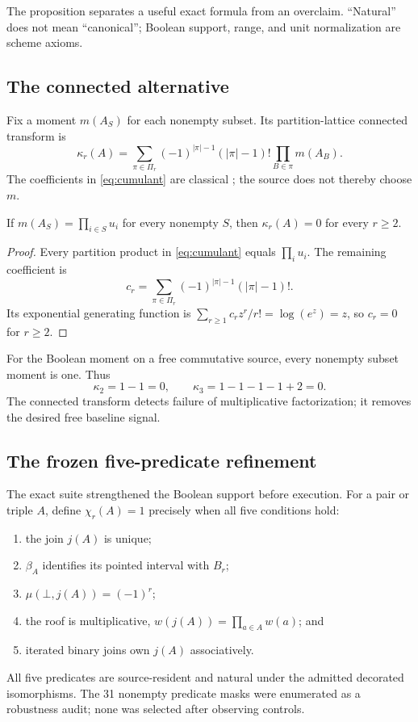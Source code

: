 The proposition separates a useful exact formula from an overclaim.
“Natural” does not mean “canonical”; Boolean support, range, and unit
normalization are scheme axioms.

\subsection{The connected alternative}

Fix a moment \(m(A_S)\) for each nonempty subset.  Its partition-lattice
connected transform is
\begin{equation}
 \kappa_r(A)=
 \sum_{\pi\in\Pi_r}(-1)^{|\pi|-1}(|\pi|-1)!
 \prod_{B\in\pi}m(A_B).
 \label{eq:cumulant}
\end{equation}
The coefficients in \eqref{eq:cumulant} are classical
\citep{Speed1983}; the source does not thereby choose \(m\).

\begin{lemma}
\label{lem:factorization-cancellation}
If
\(
 m(A_S)=\prod_{i\in S}u_i
\)
for every nonempty \(S\), then \(\kappa_r(A)=0\) for every \(r\ge2\).
\end{lemma}
\begin{proof}
Every partition product in \eqref{eq:cumulant} equals
\(\prod_i u_i\).  The remaining coefficient is
\[
 c_r=\sum_{\pi\in\Pi_r}(-1)^{|\pi|-1}(|\pi|-1)!.
\]
Its exponential generating function is
\(
 \sum_{r\ge1}c_r z^r/r!=\log(e^z)=z
\), so \(c_r=0\) for \(r\ge2\).
\end{proof}

For the Boolean moment on a free commutative source, every nonempty subset
moment is one.  Thus
\begin{equation}
 \kappa_2=1-1=0,
 \qquad
 \kappa_3=1-1-1-1+2=0.
 \label{eq:low-cumulants}
\end{equation}
The connected transform detects failure of multiplicative factorization;
it removes the desired free baseline signal.

\subsection{The frozen five-predicate refinement}

The exact suite strengthened the Boolean support before execution.  For a
pair or triple \(A\), define \(\chi_r(A)=1\) precisely when all five
conditions hold:
\begin{enumerate}
\item the join \(j(A)\) is unique;
\item \(\beta_A\) identifies its pointed interval with \(B_r\);
\item \(\mu(\bot,j(A))=(-1)^r\);
\item the roof is multiplicative,
  \(w(j(A))=\prod_{a\in A}w(a)\); and
\item iterated binary joins own \(j(A)\) associatively.
\end{enumerate}
All five predicates are source-resident and natural under the admitted
decorated isomorphisms.  The 31 nonempty predicate masks were enumerated as
a robustness audit; none was selected after observing controls.

